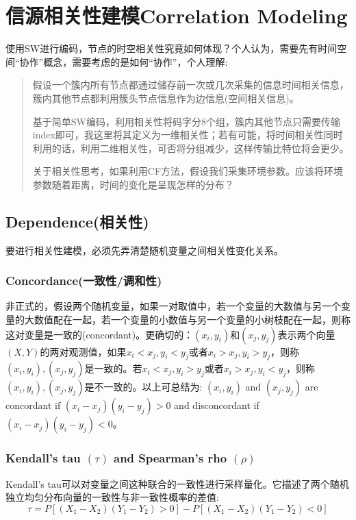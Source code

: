 \section{信源相关性建模Correlation Modeling}
使用SW进行编码，节点的时空相关性究竟如何体现？个人认为，需要先有时间空间``协作''概念，需要考虑的是如何``协作''，个人理解:
\begin{quote}
    假设一个簇内所有节点都通过储存前一次或几次采集的信息时间相关信息，簇内其他节点都利用簇头节点信息作为边信息(空间相关信息)。

    基于简单SW编码\cite{Srisooksai2012}，利用相关性将码字分8个组，簇内其他节点只需要传输index即可，我这里将其定义为一维相关性；若有可能，将时间相关性同时利用的话，利用二维相关性，可否将分组减少，这样传输比特位将会更少。

    关于相关性思考，如果利用CF方法，假设我们采集环境参数。应该将环境参数随着距离，时间的变化是呈现怎样的分布？
\end{quote}

\subsection{Dependence(相关性)}
要进行相关性建模，必须先弄清楚随机变量之间相关性变化关系。
\subsubsection{Concordance(一致性/调和性)}
非正式的，假设两个随机变量，如果一对取值中，若一个变量的大数值与另一个变量的大数值配在一起，若一个变量的小数值与另一个变量的小树枝配在一起，则称这对变量是一致的(concordant)。更确切的：$(x_i,y_i)$和$(x_j,y_j)$表示两个向量$(X,Y)$的两对观测值，如果$x_i<x_j,y_i<y_j$或者$x_i>x_j,y_i>y_j$，则称$(x_i,y_i),(x_j,y_j)$是一致的。若$x_i<x_j,y_i>y_j$或者$x_i>x_j,y_i<y_j$，则称$(x_i,y_i),(x_j,y_j)$是不一致的。以上可总结为:
$(x_i,y_i)$ and $(x_j,y_j)$ are concordant if $(x_i-x_j)(y_i-y_j)>0$ and disconcordant if $(x_i-x_j)(y_i-y_j)<0$。

\subsubsection{Kendall's tau $(\tau)$ and Spearman's rho $(\rho)$}
Kendall's tau可以对变量之间这种联合的一致性进行采样量化。它描述了两个随机独立均匀分布向量的一致性与非一致性概率的差值:
\begin{equation}
    \label{eq-tau}
    \tau = P[(X_1-X_2)(Y_1-Y_2) > 0] - P[(X_1-X_2)(Y_1-Y_2)<0]
\end{equation}

